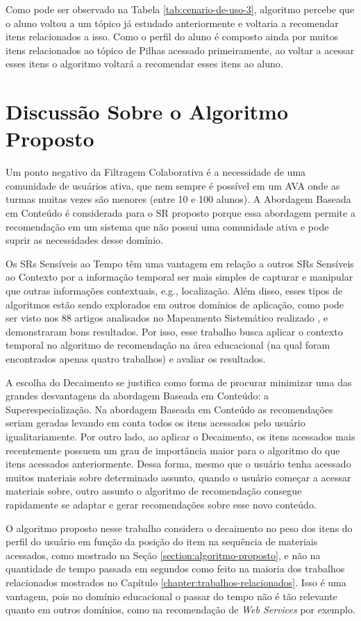 Como pode ser observado na Tabela \ref{tab:cenario-de-uso-3}, algoritmo percebe que o aluno voltou a um tópico já estudado anteriormente e
voltaria a recomendar itens relacionados a isso. Como o perfil do aluno é composto ainda por muitos itens relacionados ao tópico
de Pilhas acessado primeiramente, ao voltar a acessar esses itens o algoritmo voltará a recomendar esses itens
ao aluno.

\section{Discussão Sobre o Algoritmo Proposto}

Um ponto negativo da Filtragem Colaborativa é a necessidade de uma comunidade de usuários ativa, que nem sempre é
possível em um AVA onde as turmas muitas vezes são menores (entre 10 e 100 alunos). A Abordagem Baseada
em Conteúdo é considerada para o SR proposto porque essa abordagem permite a recomendação em um sistema que não possui uma
comunidade ativa e pode suprir as necessidades desse domínio.

Os SRs Sensíveis ao Tempo têm uma vantagem em relação a outros SRs Sensíveis ao Contexto por a informação temporal ser
mais simples de capturar e manipular que outras informações contextuais, e.g., localização. Além disso, esses tipos de
algoritmos estão sendo explorados em outros domínios de aplicação, como pode ser visto nos 88 artigos analisados no
Mapeamento Sistemático realizado \cite{de2017time}, e demonstraram bons resultados. Por isso, esse trabalho busca
aplicar o contexto temporal no algoritmo de recomendação na área educacional (na qual foram encontrados apenas quatro
trabalhos) e avaliar os resultados.

A escolha do Decaimento se justifica como forma de procurar minimizar uma das grandes desvantagens da abordagem Baseada em Conteúdo: a
Superespecialização. Na abordagem Baseada em Conteúdo as recomendações seriam geradas levando em conta todos os itens
acessados pelo usuário igualitariamente. Por outro lado, ao aplicar o Decaimento, os itens acessados mais recentemente possuem um
grau de importância maior para o algoritmo do que itens acessados anteriormente. Dessa forma, mesmo que o usuário
tenha acessado muitos materiais sobre determinado assunto, quando o usuário começar a acessar materiais sobre, outro assunto o algoritmo de
recomendação consegue rapidamente se adaptar e gerar recomendações sobre esse novo conteúdo.

O algoritmo proposto nesse trabalho considera o decaimento no peso dos itens do perfil do usuário em função da posição
do item na sequência de materiais acessados, como mostrado na Seção \ref{section:algoritmo-proposto}, e não na quantidade de tempo passada em
segundos como feito na maioria dos trabalhos relacionados mostrados no Capítulo \ref{chapter:trabalhos-relacionados}. Isso é uma vantagem, pois no domínio
educacional o passar do tempo não é tão relevante quanto em outros domínios, como na recomendação de \textit{Web Services} por
exemplo.

